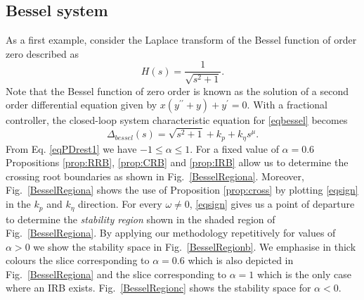 \documentclass[twoside,reqno,11pt]{fcaa-var} %
\begin{document}
\subsection{Bessel system}
As a first example, consider the Laplace transform of the Bessel function of order zero described as
\begin{equation}
H(s)=\frac{1}{\sqrt{s^2+1}}. \label{eqbessel}
\end{equation}
Note that the Bessel function of zero order is known as the solution of a second order differential equation given by $x(y^{\prime\prime}+y)+y^\prime=0$. With a fractional controller, the closed-loop system characteristic equation for \eqref{eqbessel} becomes
\begin{equation}
\Delta_{bessel}(s)=\sqrt{s^2+1}+k_p+k_\eta s^\mu. \label{eqchbessel}
\end{equation} 
From Eq. \eqref{eqPDrest1} we have $ -1\leq\alpha\leq 1$. For a fixed value of $\alpha=0.6$ Propositions \ref{prop:RRB}, \ref{prop:CRB} and \ref{prop:IRB} allow us to determine the crossing root boundaries as shown in Fig.~\ref{BesselRegiona}. Moreover, Fig.~\ref{BesselRegiona} shows the use of Proposition \ref{prop:cross} by plotting \eqref{eqsign} in the $k_p$ and $k_\eta$ direction. For every $\omega\neq0$, \eqref{eqsign} gives us a point of departure to determine the \textit{stability region} shown in the shaded region of Fig.~\ref{BesselRegiona}. By applying our methodology repetitively for values of $\alpha>0$ we show the stability space in Fig.~\ref{BesselRegionb}. We emphasise in thick colours the slice corresponding to $\alpha=0.6$ which is also depicted in Fig.~\ref{BesselRegiona} and the slice corresponding to $\alpha=1$ which is the only case where an IRB exists. Fig.~\ref{BesselRegionc} shows the stability space for $\alpha<0$.\par
\end{document}
